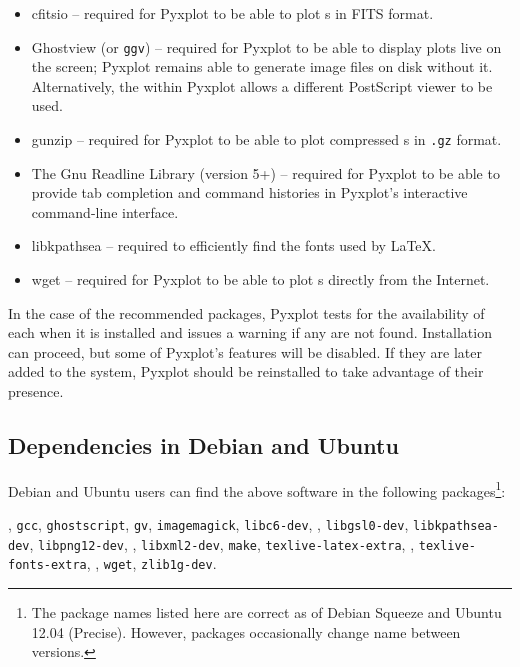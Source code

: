 \vspace{0.5cm}
\begin{itemize}
\item cfitsio -- required for Pyxplot to be able to plot \datafile s in FITS format.
\item Ghostview  (or {\tt ggv}) -- required for Pyxplot to be able to display plots live on the screen; Pyxplot remains able to generate image files on disk without it. Alternatively, the  within Pyxplot allows a different PostScript viewer to be used.
\item gunzip  -- required for Pyxplot to be able to plot compressed \datafile s in {\tt .gz} format.
\item The Gnu Readline Library (version 5+)  -- required for Pyxplot to be able to provide tab completion and command histories in Pyxplot's interactive command-line interface.
\item libkpathsea  -- required to efficiently find the fonts used by \LaTeX.
\item wget  -- required for Pyxplot to be able to plot \datafile s directly from the Internet.
\end{itemize}
\vspace{0.5cm}

\noindent In the case of the recommended packages, Pyxplot tests for the
availability of each when it is installed and issues a warning if any are not
found. Installation can proceed, but some of Pyxplot's features will be
disabled. If they are later added to the system, Pyxplot should be reinstalled
to take advantage of their presence.

\subsection{Dependencies in Debian and Ubuntu}

Debian and Ubuntu users can find the above software in the following
packages\footnote{The package names listed here are correct as of Debian
Squeeze and Ubuntu 12.04 (Precise). However, packages occasionally change name
between versions.}: 

\vspace{2mm}
, {\tt gcc}, {\tt ghostscript}, {\tt gv}, {\tt imagemagick}, {\tt libc6-dev},\newline
{}, {\tt libgsl0-dev}, {\tt libkpathsea-dev}, {\tt libpng12-dev},\newline
{}, {\tt libxml2-dev}, {\tt make}, {\tt texlive-latex-extra},\newline
{}, {\tt texlive-fonts-extra},\newline
{}, {\tt wget}, {\tt zlib1g-dev}.
\vspace{2mm}

